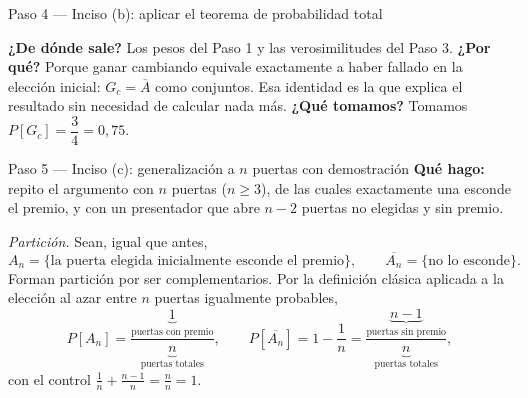 \documentclass[11pt]{article}
\begin{document}
\begin{sol}
\begin{paso}{Paso 4 --- Inciso (b): aplicar el teorema de probabilidad total}
\begin{center}
\shorthandoff{<>}
\shorthandon{<>}
\end{center}

\textbf{¿De d\'onde sale?} Los pesos del Paso 1 y las verosimilitudes del Paso 3.
\textbf{¿Por qu\'e?} Porque ganar cambiando equivale exactamente a haber fallado en la elecci\'on inicial: $G_{c}=\overline{A}$ como conjuntos. Esa identidad es la que explica el resultado sin necesidad de calcular nada m\'as.
\textbf{¿Qu\'e tomamos?} Tomamos $P[G_{c}]=\dfrac{3}{4}=0{,}75$.
\end{paso}

\begin{paso}{Paso 5 --- Inciso (c): generalizaci\'on a $n$ puertas con demostraci\'on}
\textbf{Qu\'e hago:} repito el argumento con $n$ puertas ($n\ge 3$), de las cuales exactamente una esconde el premio, y con un presentador que abre $n-2$ puertas no elegidas y sin premio.

\emph{Partici\'on.} Sean, igual que antes,
\[
A_n=\{\text{la puerta elegida inicialmente esconde el premio}\},
\qquad
\overline{A_n}=\{\text{no lo esconde}\}.
\]
Forman partici\'on por ser complementarios. Por la definici\'on cl\'asica aplicada a la elecci\'on al azar entre $n$ puertas igualmente probables,
\[
P[A_n]=\frac{\underbrace{1}_{\text{puertas con premio}}}{\underbrace{n}_{\text{puertas totales}}},
\qquad
P[\overline{A_n}]=1-\frac1n=\frac{\underbrace{n-1}_{\text{puertas sin premio}}}{\underbrace{n}_{\text{puertas totales}}} ,
\]
con el control $\tfrac1n+\tfrac{n-1}{n}=\tfrac{n}{n}=1$.


\end{paso}
\end{sol}
\end{document}
